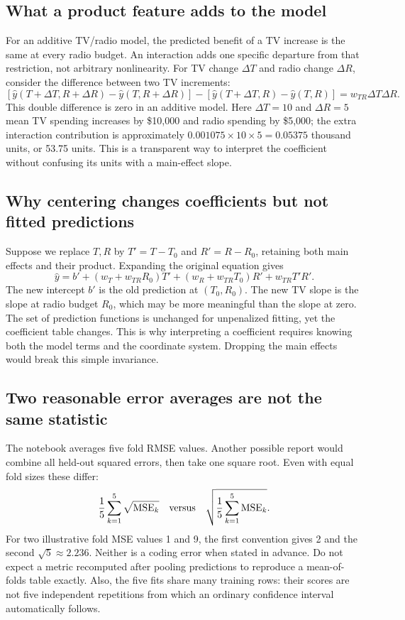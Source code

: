 \subsection*{What a product feature adds to the model}
For an additive TV/radio model, the predicted benefit of a TV increase is the same at every radio budget.
An interaction adds one specific departure from that restriction, not arbitrary nonlinearity.
For TV change $\Delta T$ and radio change $\Delta R$, consider the difference between two TV increments:
\[
[\hat y(T+\Delta T,R+\Delta R)-\hat y(T,R+\Delta R)]
-[\hat y(T+\Delta T,R)-\hat y(T,R)]
=w_{TR}\Delta T\Delta R.
\]
This double difference is zero in an additive model. Here $\Delta T=10$ and $\Delta R=5$
mean TV spending increases by \$10,000 and radio spending by \$5,000; the extra interaction contribution
is approximately $0.001075\times10\times5=0.05375$ thousand units, or 53.75 units.
This is a transparent way to interpret the coefficient without confusing its units with a main-effect slope.

\subsection*{Why centering changes coefficients but not fitted predictions}
Suppose we replace $T,R$ by $T'=T-T_0$ and $R'=R-R_0$, retaining both main effects and their product.
Expanding the original equation gives
\[
\hat y=b'+(w_T+w_{TR}R_0)T'+(w_R+w_{TR}T_0)R'+w_{TR}T'R'.
\]
The new intercept $b'$ is the old prediction at $(T_0,R_0)$. The new TV slope is the slope at radio budget $R_0$,
which may be more meaningful than the slope at zero. The set of prediction functions is unchanged for
unpenalized fitting, yet the coefficient table changes. This is why interpreting a coefficient requires knowing
both the model terms and the coordinate system. Dropping the main effects would break this simple invariance.

\subsection*{Two reasonable error averages are not the same statistic}
The notebook averages five fold RMSE values. Another possible report would combine all held-out squared errors,
then take one square root. Even with equal fold sizes these differ:
\[
\frac15\sum_{k=1}^5\sqrt{\mathrm{MSE}_k}
\quad\hbox{versus}\quad
\sqrt{\frac15\sum_{k=1}^5\mathrm{MSE}_k}.
\]
For two illustrative fold MSE values 1 and 9, the first convention gives 2 and the second $\sqrt5\approx2.236$.
Neither is a coding error when stated in advance. Do not expect a metric recomputed after pooling predictions
to reproduce a mean-of-folds table exactly. Also, the five fits share many training rows: their scores are not
five independent repetitions from which an ordinary confidence interval automatically follows.

